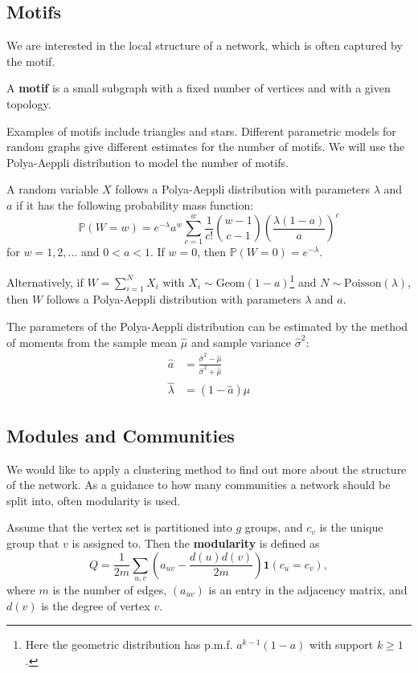 \documentclass{article}
\begin{document}
\subsection{Motifs}

We are interested in the local structure of a network, which is often captured by the motif.
\begin{definition}
    A \textbf{motif} is a small subgraph with a fixed number of vertices and with
    a given topology.
\end{definition}

Examples of motifs include triangles and stars. Different parametric models for random graphs give different estimates for the number of motifs. We will use the Polya-Aeppli distribution to model the number of motifs.  

\begin{definition}
    A random variable $X$ follows a Polya-Aeppli distribution with parameters $\lambda$ and $a$ if it has the following probability mass function:
    \begin{equation*}
        \mathbb{P}(W=w)=e^{-\lambda}a^{w}\sum_{c=1}^{w}\frac{1}{c!}\binom{w-1}{c-1}\left(\frac{\lambda(1-a)}{a}\right)^{c}
    \end{equation*}
    for $w=1,2,\ldots$ and $0<a<1$. If $w=0$, then $\mathbb{P}(W=0)=e^{-\lambda}$.
\end{definition}

Alternatively, if $W=\sum_{i=1}^{N}X_{i}$ with $X_{i}\sim\mathrm{Geom}(1-a)$\footnote{Here the geometric distribution has p.m.f. $a^{k-1}(1-a)$ with support $k\geq 1$. } and $N\sim \mathrm{Poisson}(\lambda)$, then $W$ follows a Polya-Aeppli distribution with parameters $\lambda$ and $a$.  

The parameters of the Polya-Aeppli distribution can be estimated by the method of moments from the sample mean $\hat{\mu}$ and sample variance $\hat{\sigma}^2$:
\begin{align*}
    \hat{a} &= \frac{\hat{\sigma}^2 - \hat{\mu}}{\hat{\sigma}^2+\hat{\mu}}\\
    \hat{\lambda} &= (1-\hat{a})\hat{\mu}
\end{align*}


\subsection{Modules and Communities}
We would like to apply a clustering method to find out more about the structure of the network. As a guidance to how many communities a network should be split into, often modularity is used.  
\begin{definition}
    Assume that the vertex set is partitioned into \( g \) groups, and
\( c_v \) is the unique group that \( v \) is assigned to. 
Then the \textbf{modularity} is defined as
\[
Q = \frac{1}{2m} \sum_{u,v} \left( a_{uv} - \frac{d(u)d(v)}{2m} \right) \mathbf{1}(c_u= c_v),
\]
where \( m \) is the number of edges, \((a_{uv}) \) is an entry in the adjacency matrix, and \( d(v) \)
is the degree of vertex \( v \).
\end{definition}
\end{document}
